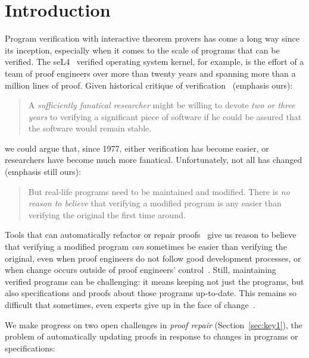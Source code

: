 \section{Introduction}

Program verification with interactive theorem provers has come a long way since its inception,
especially when it comes to the scale of programs that can be verified.
The seL4~\cite{Klein2009} verified operating system kernel, for example,
is the effort of a team of proof engineers over more than twenty years and spanning more than
a million lines of proof.
Given historical critique of verification~\cite{DeMillo1977} (emphasis ours):

\begin{quote}
A \textit{sufficiently fanatical researcher}
might be willing to devote \textit{two or 
three years} to verifying a significant 
piece of software if he could be 
assured that the software would remain stable.
\end{quote}
we could argue that, since 1977, either verification has become easier,
or researchers have become much more fanatical. Unfortunately, not all has changed (emphasis still ours):

\begin{quote}
But real-life programs need to 
be maintained and modified. 
There is \textit{no reason to believe} that verifying a modified program is any 
easier than verifying the original the 
first time around.
\end{quote}
Tools that can automatically refactor or repair proofs~\cite{wibergh2019, WhitesidePhD, Dietrich2013, adams2015, Bourke12, Roe2016, robert2018, pumpkinpatch}
give us reason to believe that verifying a modified program \textit{can} sometimes be easier than verifying the original, even when proof engineers do not follow good development processes,
or when change occurs outside of proof engineers' control~\cite{PGL-045}.
Still, maintaining verified programs can be challenging: it means keeping not just the programs, but also specifications and proofs about those programs up-to-date.
This remains so difficult that sometimes, even experts give up in the face of change~\cite{replica}.

We make progress on two open challenges in \textit{proof repair} (Section~\ref{sec:key1}), the problem of automatically updating proofs in response
to changes in programs or specifications:

